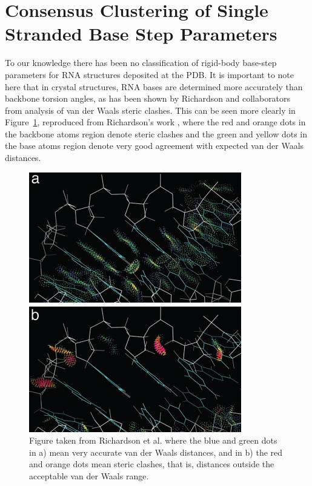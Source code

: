 \section{Consensus Clustering of Single Stranded Base Step Parameters}
To  our  knowledge there  has  been  no  classification of  rigid-body
base-step parameters  for RNA structures  deposited at the PDB.  It is
important  to note  here that  in  crystal structures,  RNA bases  are
determined more  accurately than backbone torsion angles,  as has been
shown by Richardson  and collaborators from analysis of  van der Waals
steric    clashes.    This    can    be   seen    more   clearly    in
Figure~\ref{fig:murray},    reproduced    from    Richardson's    work
\cite{murray2003}, where the red and orange dots in the backbone atoms
region denote steric clashes and the green and yellow dots in the base
atoms region  denote very good  agreement with expected van  der Waals
distances.
\begin{figure}[htbp]
 \centering
 \includegraphics[scale=0.5]{Chapter2/murray2003.png}
 \caption{Figure taken from  Richardson et al. \cite{murray2003} where
 the  blue and  green dots  in  a) mean  very accurate  van der  Waals
 distances, and  in b)  the red and  orange dots mean  steric clashes,
 that is, distances outside the acceptable van der Waals range.}
 \label{fig:murray}
\end{figure}


